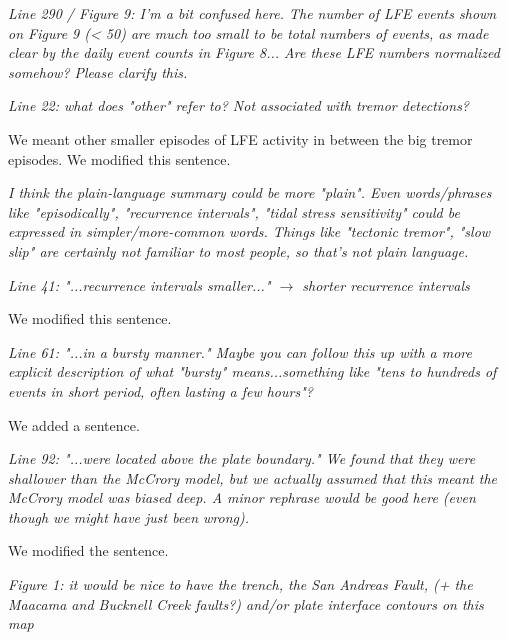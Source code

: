 \documentclass[letterpaper, 12pt]{article}
\begin{document}
\bigskip

\textit{Line 290 / Figure 9: I'm a bit confused here. The number of LFE events shown on Figure 9 (< 50) are much too small to be total numbers of events, as made clear by the daily event counts in Figure 8... Are these LFE numbers normalized somehow? Please clarify this.} 

\bigskip

\textit{Line 22: what does "other" refer to? Not associated with tremor detections?}

\bigskip

We meant other smaller episodes of LFE activity in between the big tremor episodes. We modified this sentence.

\bigskip

\textit{I think the plain-language summary could be more "plain". Even words/phrases like "episodically", "recurrence intervals", "tidal stress sensitivity" could be expressed in  simpler/more-common words. Things like "tectonic tremor", "slow slip" are certainly not familiar to most people, so that's not plain language.}

\bigskip

\textit{Line 41: "...recurrence intervals smaller..." $\rightarrow$ shorter recurrence intervals}

\bigskip

We modified this sentence.

\bigskip

\textit{Line 61: "...in a bursty manner." Maybe you can follow this up with a more explicit description of what "bursty" means...something like "tens to hundreds of events in short period, often lasting a few hours"?}

\bigskip

We added a sentence.

\bigskip

\textit{Line 92: "...were located above the plate boundary." We found that they were shallower than the McCrory model, but we actually assumed that this meant the McCrory model was biased deep. A minor rephrase would be good here (even though we might have just been wrong).}

\bigskip

We modified the sentence.

\bigskip

\textit{Figure 1: it would be nice to have the trench, the San Andreas Fault, (+ the Maacama and Bucknell Creek faults?) and/or plate interface contours on this map}
\end{document}
